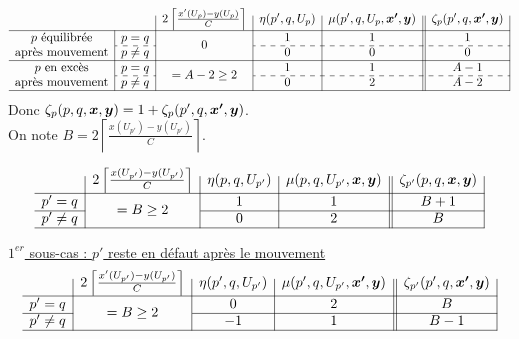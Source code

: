 \begin{gather*}
  \begin{array}{c|c|c|c|c||c|}
    \multicolumn{2}{c|}{}
    & 2 \left\lceil \frac{x'(U_p)-y(U_p)}{C} \right\rceil
    & \eta(p',q,U_p)
    & \mu(p',q,U_p,\bs{x'},\bs{y})
    & \zeta_p(p',q,\bs{x'},\bs{y})
    \\ \hline
    p \mbox{ équilibrée}
    & p=q
    & \multirow{2}{*}{$0$}
    & 1
    & 1
    & 1
    \\ \cdashline{2-2}\cdashline{4-6}
    \mbox{après mouvement}
    & p \ne q
    &
    & 0
    & 0
    & 0
    \\ \hline
    p \mbox{ en excès}
    & p=q
    & \multirow{2}{*}{$= A-2 \ge 2$}
    & 1
    & 1
    & A-1
    \\ \cdashline{2-2}\cdashline{4-6}
    \mbox{après mouvement}
    & p \ne q
    &
    & 0
    & 2
    & A-2
    \\ \hline
  \end{array}
\end{gather*}
Donc $\zeta_p(p,q,\boldsymbol{x},\boldsymbol{y}) = 1 + \zeta_p(p',q,\boldsymbol{x'},\boldsymbol{y})$.
\\

On note $B = 2 \left\lceil \frac{\displaystyle x(U_{p'})-y(U_{p'})}{\displaystyle C} \right\rceil$.

\begin{gather*}
  \begin{array}{r|c|c|c||c|}
    & 2 \left\lceil \frac{x(U_{p'})-y(U_{p'})}{C} \right\rceil
    & \eta(p,q,U_{p'})
    & \mu(p,q,U_{p'},\bs{x},\bs{y})
    & \zeta_{p'}(p,q,\bs{x},\bs{y})
    \\ \hline
    p' = q
    & \multirow{2}{*}{$= B \ge 2$}
    & 1
    & 1
    & B + 1
    \\ \cline{1-1}\cline{3-5}
    p' \ne q
    &
    & 0
    & 2
    & B
    \\ \hline
  \end{array}
\end{gather*}

\underline{$1^{er}$ sous-cas : $p'$ reste en défaut après le mouvement}
\begin{gather*}
  \begin{array}{r|c|c|c||c|}
    & 2 \left\lceil \frac{x'(U_{p'})-y(U_{p'})}{C} \right\rceil
    & \eta(p',q,U_{p'})
    & \mu(p',q,U_{p'},\bs{x'},\bs{y})
    & \zeta_{p'}(p',q,\bs{x'},\bs{y})
    \\ \hline
    p' = q
    & \multirow{2}{*}{$= B \ge 2$}
    & 0
    & 2
    & B
    \\ \cline{1-1}\cline{3-5}
    p' \ne q
    &
    & -1
    & 1
    & B - 1
    \\ \hline
  \end{array}
\end{gather*}

